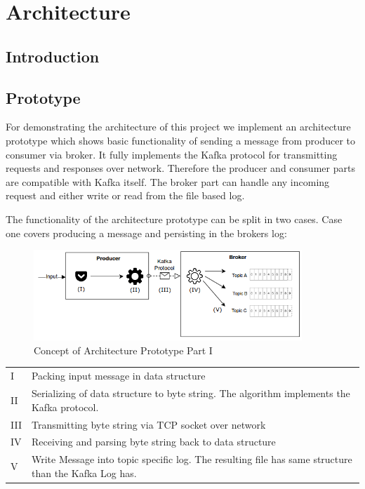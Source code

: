 \chapter{Architecture}

\section{Introduction}
\section{Prototype}
For demonstrating the architecture of this project we implement an architecture
prototype which shows basic functionality of sending a message from producer to 
consumer via broker. It fully implements the Kafka protocol for transmitting requests
and responses over network. Therefore the producer and consumer parts are compatible 
with Kafka itself. The broker part can handle any incoming request and either write or 
read from the file based log. 

The functionality of the architecture prototype can be split in two cases.
Case one covers producing a message and persisting in the brokers log:
\begin{figure}[H]
    \centering
    \includegraphics[width=0.9\textwidth]{images/concept_producer.png}
    \caption{Concept of Architecture Prototype Part I}
    \label{fig:conept-producer}
\end{figure}

\begin{table}[h]
\begin{tabular}{ll}
I   & Packing input message in data structure                                                          \\
II  & Serializing of data structure to byte string. The algorithm implements the Kafka protocol.       \\
III & Transmitting byte string via TCP socket over network                                             \\
IV  & Receiving and parsing byte string back to data structure                                         \\
V   & Write Message into topic specific log. The resulting file has same structure than the Kafka Log has.
\end{tabular}
\end{table}

